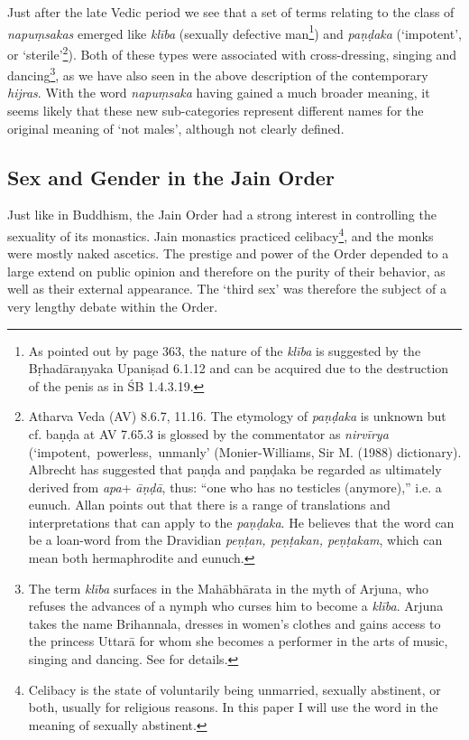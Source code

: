 Just after the late Vedic period we see that a set of terms relating to the class of {\em napuṃsakas} emerged like {\em klība} (sexually defective man\footnote{As pointed out by \cite{zwilling} page 363, the nature of the {\em klība} is suggested by the Bṛhadāraṇyaka Upaniṣad 6.1.12 and can be acquired due to the destruction of the penis as in ŚB 1.4.3.19.}) and {\em paṇḍaka} (`impotent', or `sterile'\footnote{Atharva Veda (AV) 8.6.7, 11.16. The etymology of {\em paṇḍaka} is unknown but cf. baṇḍa at AV 7.65.3 is glossed by the commentator as {\em nirvīrya} (`impotent, powerless, unmanly' (Monier-Williams, Sir M. (1988) dictionary). Albrecht \cite{wezler} has suggested that paṇḍa and paṇḍaka be regarded as ultimately derived from {\em *apa}+ {\em āṇḍā}, thus: “one who has no testicles (anymore),” i.e. a eunuch. Allan \cite{bomhard} points out that there is a range of translations and interpretations that can apply to the {\em paṇḍaka}. He believes that the word can be a loan-word from the Dravidian {\em peṇṭan, peṇṭakan, peṇṭakam}, which can mean both hermaphrodite and eunuch.}). Both of these types were associated with cross-dressing, singing and dancing\footnote{The term {\em klība} surfaces in the Mahābhārata in the myth of Arjuna, who refuses the advances of a nymph who curses him to become a {\em klība}. Arjuna takes the name Brihannala, dresses in women's clothes and gains access to the princess Uttarā for whom she becomes a performer in the arts of music, singing and dancing. See \cite{cassell} for details.}, as we have also seen in the above description of the contemporary {\em hijras}. With the word {\em napuṃsaka} having gained a much broader meaning, it seems likely that these new sub-categories represent different names for the original meaning of `not males', although not clearly defined.


\subsection{Sex and Gender in the Jain Order}
Just like in Buddhism, the Jain Order had a strong interest in controlling the sexuality of its monastics. Jain monastics practiced celibacy\footnote{Celibacy is the state of voluntarily being unmarried, sexually abstinent, or both, usually for religious reasons. In this paper I will use the word in the meaning of sexually abstinent.}, and the monks were mostly naked ascetics. The prestige and power of the Order depended to a large extend on public opinion and therefore on the purity of their behavior, as well as their external appearance. The `third sex' was therefore the subject of a very lengthy debate within the Order. 

